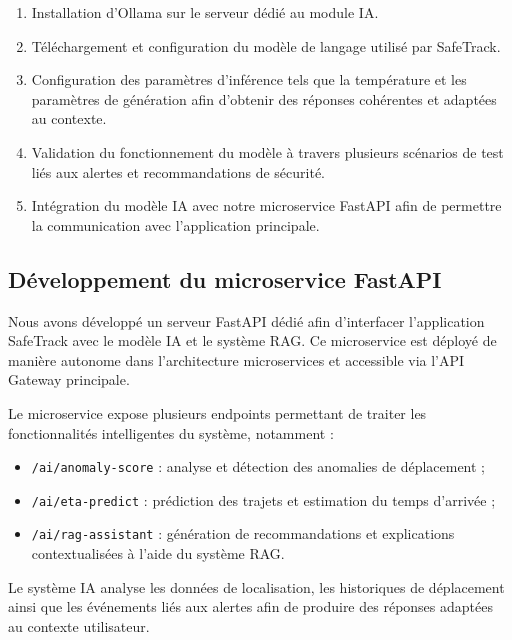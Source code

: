 \begin{enumerate}
    \item Installation d’Ollama sur le serveur dédié au module IA.
    
    \item Téléchargement et configuration du modèle de langage utilisé par SafeTrack.
    
    \item Configuration des paramètres d’inférence tels que la température et les paramètres de génération afin d’obtenir des réponses cohérentes et adaptées au contexte.
    
    \item Validation du fonctionnement du modèle à travers plusieurs scénarios de test liés aux alertes et recommandations de sécurité.
    
    \item Intégration du modèle IA avec notre microservice FastAPI afin de permettre la communication avec l’application principale.
\end{enumerate}

\subsection{Développement du microservice FastAPI}

Nous avons développé un serveur FastAPI dédié afin d’interfacer l’application SafeTrack avec le modèle IA et le système RAG. Ce microservice est déployé de manière autonome dans l’architecture microservices et accessible via l’API Gateway principale.

Le microservice expose plusieurs endpoints permettant de traiter les fonctionnalités intelligentes du système, notamment :

\begin{itemize}
    \item \texttt{/ai/anomaly-score} : analyse et détection des anomalies de déplacement ;
    
    \item \texttt{/ai/eta-predict} : prédiction des trajets et estimation du temps d’arrivée ;
    
    \item \texttt{/ai/rag-assistant} : génération de recommandations et explications contextualisées à l’aide du système RAG.
\end{itemize}

Le système IA analyse les données de localisation, les historiques de déplacement ainsi que les événements liés aux alertes afin de produire des réponses adaptées au contexte utilisateur.

